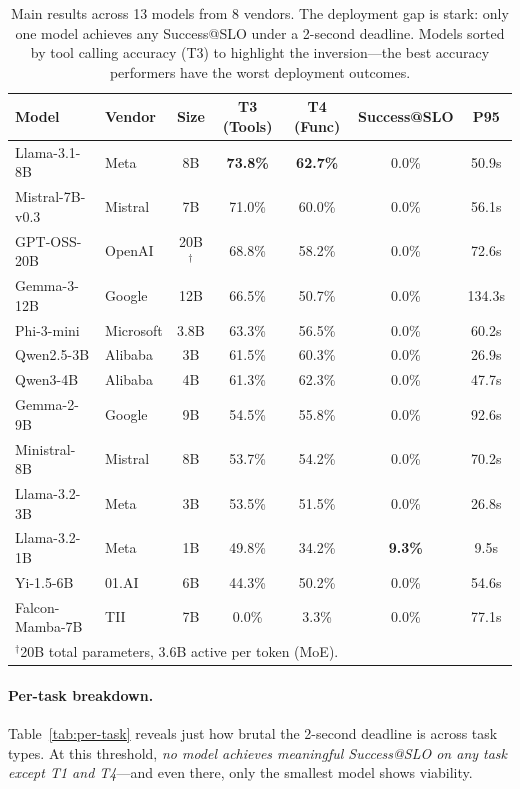 \documentclass[11pt]{article}
\begin{document}
\begin{table}[t]
\centering
\caption{Main results across 13 models from 8 vendors. The deployment gap is stark: only one model achieves any Success@SLO under a 2-second deadline. Models sorted by tool calling accuracy (T3) to highlight the inversion---the best accuracy performers have the worst deployment outcomes.}
\label{tab:main-results}
\small
\begin{tabular}{llccccc}
\toprule
\textbf{Model} & \textbf{Vendor} & \textbf{Size} & \textbf{T3 (Tools)} & \textbf{T4 (Func)} & \textbf{Success@SLO} & \textbf{P95} \\
\midrule
Llama-3.1-8B & Meta & 8B & \textbf{73.8\%} & \textbf{62.7\%} & 0.0\% & 50.9s \\
Mistral-7B-v0.3 & Mistral & 7B & 71.0\% & 60.0\% & 0.0\% & 56.1s \\
GPT-OSS-20B & OpenAI & 20B$^\dagger$ & 68.8\% & 58.2\% & 0.0\% & 72.6s \\
Gemma-3-12B & Google & 12B & 66.5\% & 50.7\% & 0.0\% & 134.3s \\
Phi-3-mini & Microsoft & 3.8B & 63.3\% & 56.5\% & 0.0\% & 60.2s \\
Qwen2.5-3B & Alibaba & 3B & 61.5\% & 60.3\% & 0.0\% & 26.9s \\
Qwen3-4B & Alibaba & 4B & 61.3\% & 62.3\% & 0.0\% & 47.7s \\
Gemma-2-9B & Google & 9B & 54.5\% & 55.8\% & 0.0\% & 92.6s \\
Ministral-8B & Mistral & 8B & 53.7\% & 54.2\% & 0.0\% & 70.2s \\
Llama-3.2-3B & Meta & 3B & 53.5\% & 51.5\% & 0.0\% & 26.8s \\
Llama-3.2-1B & Meta & 1B & 49.8\% & 34.2\% & \textbf{9.3\%} & 9.5s \\
Yi-1.5-6B & 01.AI & 6B & 44.3\% & 50.2\% & 0.0\% & 54.6s \\
Falcon-Mamba-7B & TII & 7B & 0.0\% & 3.3\% & 0.0\% & 77.1s \\
\bottomrule
\multicolumn{7}{l}{\footnotesize $^\dagger$20B total parameters, 3.6B active per token (MoE).} \\
\end{tabular}
\end{table}

\paragraph{Per-task breakdown.}
Table~\ref{tab:per-task} reveals just how brutal the 2-second deadline is across task types.
At this threshold, \emph{no model achieves meaningful Success@SLO on any task except T1 and T4}---and even there, only the smallest model shows viability.
\end{document}
